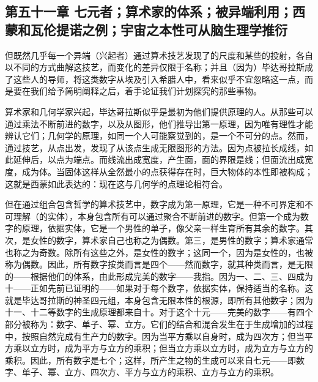 \subsection{第五十一章 七元者；算术家的体系；被异端利用；西蒙和瓦伦提诺之例；宇宙之本性可从脑生理学推衍}

但既然几乎每一个异端（兴起者）通过算术技艺发现了的尺度和某些的投射，各自以不同的方式曲解这技艺，而变化的差异仅限于名称；并且（因为）毕达哥拉斯成了这些人的导师，将这类数字从埃及引入希腊人中，看来似乎不宜忽略这一点，而是要在我们给予简明阐释之后，着手论证我们计划探究的那些事物。\par

算术家和几何学家兴起，毕达哥拉斯似乎是最初为他们提供原理的人。从那些可以通过乘法不断前进的数字，以及从图形，他们推导出第一原理，因为唯有理性才能辨认它们；几何学的原理，如同一个人可能察觉到的，是一个不可分的点。然而，通过技艺，从点出发，发现了从该点生成无限图形的方法。因为点被拉长成线，如此延伸后，以点为端点。而线流出成宽度，产生面，面的界限是线；但面流出成宽度，成为体。当固体这样从全然最小的点获得存在时，巨大物体的本性即被构成；这就是西蒙如此表达的：现在这与几何学的点理论相符合。\par

但在通过组合包含哲学的算术技艺中，数字成为第一原理，它是一种不可界定和不可理解（的实体），本身包含所有可以通过聚合不断前进的数字。但第一个成为数字的原理，依据实体，它是一个男性的单子，像父亲一样生育所有其余的数字。其次，是女性的数字，算术家自己也称之为偶数。第三，是男性的数字；算术家通常也称之为奇数。除所有这些之外，是女性的数字；这同一个，因为是女性的，也被称为偶数。因此，所有数字按类而言是四个——然而数字，就其种类而言，是无限的——根据他们的体系，由此形成完美的数字——我指。因为一、二、三、四成为十——正如先前已证明的——如果对于每个数字，依据实体，保持适当的名称。这就是毕达哥拉斯的神圣四元组，本身包含无限本性的根源，即所有其他数字；因为十一、十二等数字的生成原理都来自十。对于这个十元——完美的数字——有四个部分被称为：数字、单子、幂、立方。它们的结合和混合发生在于生成增加的过程中，按照自然完成有生产力的数字。因为当平方乘以自身时，成为四次方；但当平方乘以立方时，成为平方与立方的乘积；但当立方乘以立方时，成为立方与立方的乘积。因此，所有数字是七个；这样，所产生之物的生成可以来自七元——即数字、单子、幂、立方、四次方、平方与立方的乘积、立方与立方的乘积。\par

